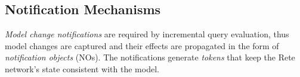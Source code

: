 


\subsection{Notification Mechanisms}
\label{notifications}

\emph{Model change notifications} are required by incremental query evaluation, thus model changes are captured and their effects are propagated in the form of \emph{notification objects} (NOs). The notifications generate \emph{tokens} that keep the Rete network's state consistent with the model. 


